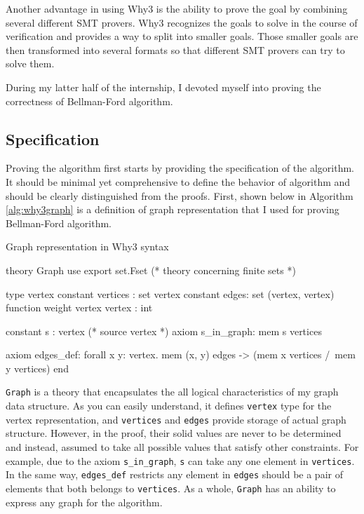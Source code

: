 \documentclass[a4paper,12pt]{article}
\begin{document}
Another advantage in using Why3 is the ability to prove the goal by
combining several different SMT provers. Why3 recognizes the goals to
solve in the course of verification and provides a way to split into
smaller goals. Those smaller goals are then transformed into several
formats so that different SMT provers can try to solve them.

During my latter half of the internship, I devoted myself into proving
the correctness of Bellman-Ford algorithm.

\subsection{Specification}

Proving the algorithm first starts by providing the specification of
the algorithm. It should be minimal yet comprehensive to define the
behavior of algorithm and should be clearly distinguished from the
proofs. First, shown below in Algorithm \ref{alg:why3graph} is a
definition of graph representation that I used for proving
Bellman-Ford algorithm.

\begin{algorithm}
\caption{Graph representation in Why3 syntax}\label{alg:why3graph}
\begin{why3}
theory Graph
  use export set.Fset (* theory concerning finite sets *)

  type vertex
  constant vertices : set vertex
  constant edges: set (vertex, vertex)
  function weight vertex vertex : int

  constant s : vertex (* source vertex *)
  axiom s_in_graph: mem s vertices

  axiom edges_def:
    forall x y: vertex. mem (x, y) edges ->
    (mem x vertices /\ mem y vertices)
end
\end{why3}
\end{algorithm}

\texttt{Graph} is a theory that encapsulates the all logical
characteristics of my graph data structure. As you can easily
understand, it defines \texttt{vertex} type for the vertex
representation, and \texttt{vertices} and \texttt{edges} provide
storage of actual graph structure. However, in the proof, their solid
values are never to be determined and instead, assumed to take all
possible values that satisfy other constraints. For example, due to
the axiom \texttt{s\_in\_graph}, \texttt{s} can take any one element
in \texttt{vertices}. In the same way, \texttt{edges\_def} restricts
any element in \texttt{edges} should be a pair of elements that both
belongs to \texttt{vertices}. As a whole, \texttt{Graph} has an
ability to express any graph for the algorithm.
\end{document}

